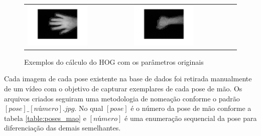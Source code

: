 \begin{figure}[H]
	\centering
	\begin{tabular}{p{} p{}}
		\vspace{1pt} \includegraphics[width=0.6\textwidth]{image/hog/0_01.png} &
		\vspace{0pt} \includegraphics[width=0.6\textwidth]{image/hog/7_01.png}
	\end{tabular}	
  	\caption{Exemplos do cálculo do HOG com os parâmetros originais}
  	\label{fig:hog_example1}
\end{figure}

Cada imagem de cada pose existente na base de dados foi retirada manualmente de um vídeo com o objetivo de capturar exemplares de cada pose de mão. Os arquivos criados seguiram uma metodologia de nomeação conforme o padrão \([pose]\_[número].jpg\). No qual \([pose]\) é o número da pose de mão conforme a tabela \ref{table:poses_mao} e \([número]\) é uma enumeração sequencial da pose para diferenciação das demais semelhantes.

\newcommand{\addpose}[2] {
	\arabic{table:counter_poses_mao} \stepcounter{table:counter_poses_mao} & 
	#1 & 
	\texttt{[image: \#2]}
}

